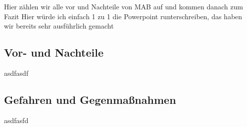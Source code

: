 \documentclass[conference]{IEEEtran}
\begin{document}
Hier zählen wir alle vor und Nachteile von MAB auf und kommen danach zum Fazit
Hier würde ich einfach 1 zu 1 die Powerpoint runterschreiben, das haben wir bereits sehr ausführlich gemacht

\subsection{Vor- und Nachteile}
asdfasdf

\subsection{Gefahren und Gegenmaßnahmen}
asdfasfd





\appendix
\end{document}

